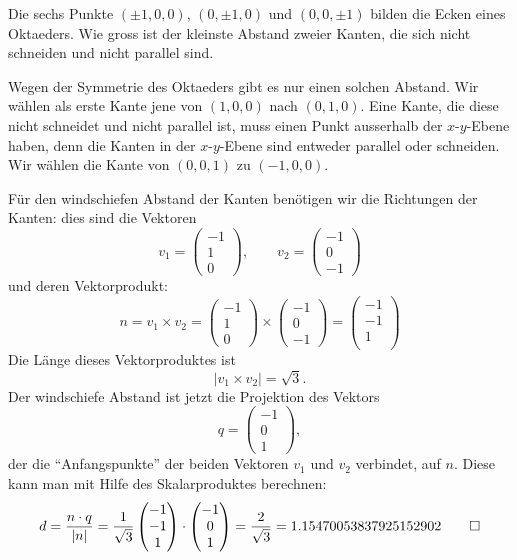 Die sechs Punkte $(\pm 1,0,0)$, $(0,\pm1,0)$ und $(0,0,\pm1)$ bilden
die Ecken eines Oktaeders.
Wie gross ist der kleinste Abstand zweier Kanten, die sich
nicht schneiden und nicht parallel sind.

\begin{loesung}
Wegen der Symmetrie des Oktaeders gibt es nur einen solchen Abstand.
Wir wählen als erste Kante jene von $(1,0,0)$ nach $(0,1,0)$. Eine
Kante, die diese nicht schneidet und nicht parallel ist, muss einen
Punkt ausserhalb der $x$-$y$-Ebene haben, denn die Kanten in der
$x$-$y$-Ebene sind entweder parallel oder schneiden. Wir wählen die
Kante von $(0,0,1)$ zu $(-1,0,0)$.

Für den windschiefen Abstand der Kanten benötigen wir die Richtungen
der Kanten: dies sind die Vektoren
\[
v_1=\begin{pmatrix}
-1\\1\\0
\end{pmatrix}
,\qquad
v_2=\begin{pmatrix}
-1\\0\\-1
\end{pmatrix}
\]
und deren Vektorprodukt:
\[
n=v_1\times v_2
=
\begin{pmatrix}
-1\\1\\0
\end{pmatrix}
\times
\begin{pmatrix}
-1\\0\\-1
\end{pmatrix}
=
\begin{pmatrix}
-1\\
-1\\
1\\
\end{pmatrix}
\]
Die Länge  dieses Vektorproduktes ist
\[
|v_1\times v_2|=\sqrt{3}.
\]
Der windschiefe Abstand ist jetzt die Projektion des Vektors
\[
q=\begin{pmatrix}
-1\\0\\1
\end{pmatrix},
\]
der die ``Anfangspunkte''  der beiden Vektoren $v_1$ und $v_2$
verbindet, auf $n$. Diese kann man mit Hilfe des Skalarproduktes
berechnen:
\[
d=\frac{n\cdot q}{|n|}=
\frac1{\sqrt{3}} \begin{pmatrix}-1\\-1\\1\end{pmatrix}\cdot\begin{pmatrix}
-1\\0\\1
\end{pmatrix}
=\frac2{\sqrt{3}}
=1.15470053837925152902
\qedhere
\]
\end{loesung}

